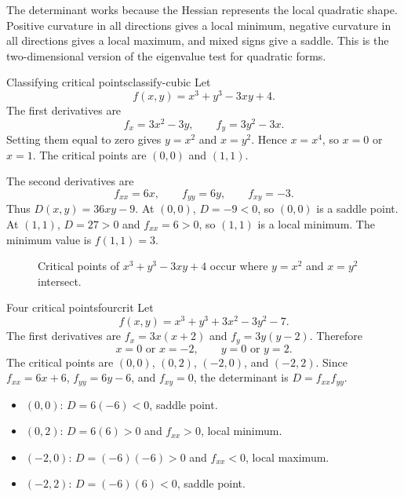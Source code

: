 \documentclass[11pt]{article}
\begin{document}
The determinant works because the Hessian represents the local quadratic shape. Positive curvature in all directions gives a local minimum, negative curvature in all directions gives a local maximum, and mixed signs give a saddle. This is the two-dimensional version of the eigenvalue test for quadratic forms.

\begin{workedexample}{Classifying critical points}{classify-cubic}
Let
\[
f(x,y)=x^3+y^3-3xy+4.
\]
The first derivatives are
\[
f_x=3x^2-3y,\qquad f_y=3y^2-3x.
\]
Setting them equal to zero gives $y=x^2$ and $x=y^2$. Hence $x=x^4$, so $x=0$ or $x=1$. The critical points are $(0,0)$ and $(1,1)$.

The second derivatives are
\[
f_{xx}=6x,\qquad f_{yy}=6y,\qquad f_{xy}=-3.
\]
Thus $D(x,y)=36xy-9$. At $(0,0)$, $D=-9<0$, so $(0,0)$ is a saddle point. At $(1,1)$, $D=27>0$ and $f_{xx}=6>0$, so $(1,1)$ is a local minimum. The minimum value is $f(1,1)=3$.
\end{workedexample}

\begin{figure}[H]
\centering
{}
\caption{Critical points of $x^3+y^3-3xy+4$ occur where $y=x^2$ and $x=y^2$ intersect.}
\end{figure}

\begin{workedexample}{Four critical points}{fourcrit}
Let
\[
f(x,y)=x^3+y^3+3x^2-3y^2-7.
\]
The first derivatives are $f_x=3x(x+2)$ and $f_y=3y(y-2)$. Therefore
\[
x=0\text{ or }x=-2,
\qquad
 y=0\text{ or }y=2.
\]
The critical points are $(0,0)$, $(0,2)$, $(-2,0)$, and $(-2,2)$. Since $f_{xx}=6x+6$, $f_{yy}=6y-6$, and $f_{xy}=0$, the determinant is $D=f_{xx}f_{yy}$.
\begin{itemize}
  \item $(0,0)$: $D=6(-6)<0$, saddle point.
  \item $(0,2)$: $D=6(6)>0$ and $f_{xx}>0$, local minimum.
  \item $(-2,0)$: $D=(-6)(-6)>0$ and $f_{xx}<0$, local maximum.
  \item $(-2,2)$: $D=(-6)(6)<0$, saddle point.
\end{itemize}
\end{workedexample}
\end{document}
